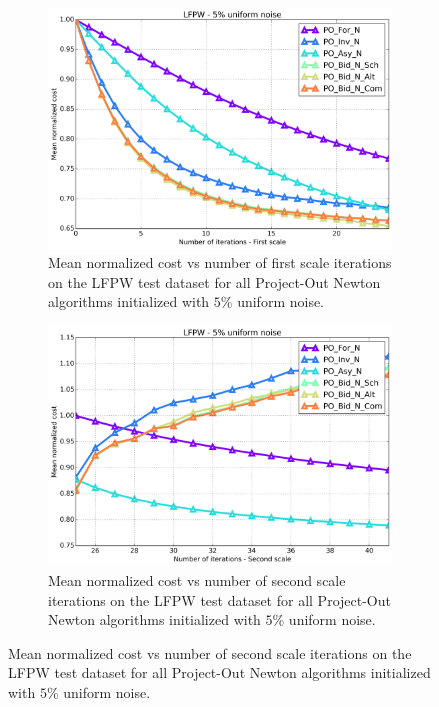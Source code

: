 \begin{figure}[p]
	\par\bigskip\bigskip
	\begin{subfigure}{0.48\textwidth}
	    \includegraphics[width=\textwidth]{experiments/algorithms/po_n/mean_cost_vs_iters1_po_n_5.png}
	    \caption{Mean normalized cost vs number of first scale iterations on the LFPW test dataset for all Project-Out Newton algorithms initialized with $5\%$ uniform noise.}
	    \label{fig:mean_cost_vs_iters1_bpo_n_5}
	\end{subfigure}
	\hfill
	\begin{subfigure}{0.48\textwidth}
	    \includegraphics[width=\textwidth]{experiments/algorithms/po_n/mean_cost_vs_iters2_po_n_5.png}
	    \caption{Mean normalized cost vs number of second scale iterations on the LFPW test dataset for all Project-Out Newton algorithms initialized with $5\%$ uniform noise.}

\end{subfigure}
\end{figure}
